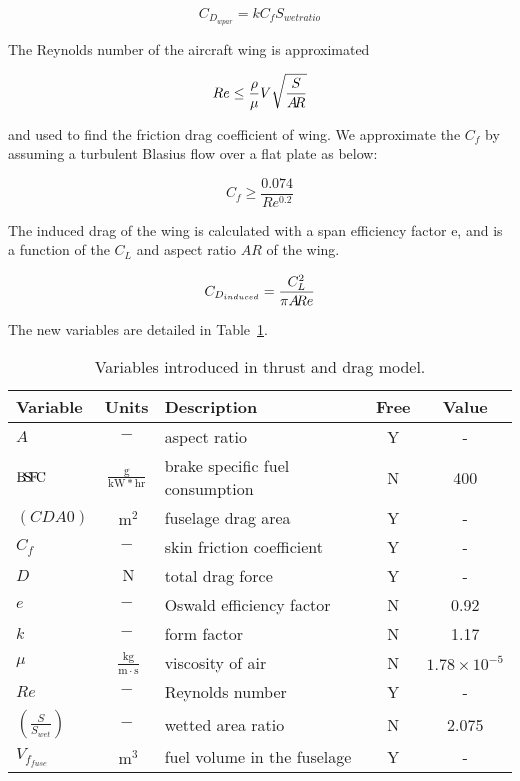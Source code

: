 \begin{equation}
    C_{D_{wpar}} = k C_f S_{wetratio}
\label{e:cdwpar}
\end{equation}

The Reynolds number of the aircraft wing is approximated

\begin{equation}
    Re \leq \frac{\rho}{\mu} V \sqrt{\frac{S}{A\hspace{-2.0pt}R}}
\label{e:re}
\end{equation}

and used to find the friction drag coefficient of wing. We approximate the $C_f$ by assuming a
turbulent Blasius flow over a flat plate as below:

\begin{equation}
    C_f \geq \frac{0.074} {Re^{0.2}}
\end{equation}

The induced drag of the wing is calculated with a span efficiency factor e, and is a
function of the $C_L$ and aspect ratio $AR$ of the wing.

\begin{equation}
    C_{D_{induced}} = \frac{C_L^2}{\pi A\hspace{-2.0pt}R e}
\label{e:cdinduced}
\end{equation}

The new variables are detailed in Table~\ref{t:vars_TandD}.

\begin{footnotesize}
\begin{table}
    \centering
    \begin{tabular}{ l c l c c }
        \toprule
        Variable & Units & Description & Free & Value \\
        \midrule
        $A$ & $-$ & aspect ratio & Y & - \\
        ${\rm B\!S\!F\!C}$ & $\mathrm{\frac{g}{kW*hr}}$ & brake specific fuel consumption & N & 400 \\
        $(CDA0)$ & $~\mathrm{m^{2}}$ & fuselage drag area & Y & - \\
        $C_f$ & $-$ & skin friction coefficient & Y & - \\
        $D$ & $~\mathrm{N}$ & total drag force & Y & - \\
        $e$ & $-$ & Oswald efficiency factor & N & 0.92 \\
        $k$ & $-$ & form factor & N & 1.17 \\
        $\mu$ & $~\mathrm{\tfrac{kg}{m\cdot s}}$ & viscosity of air & N &
            $\mathrm{1.78 \times 10^{-5}}$ \\
        $Re$ & $-$ & Reynolds number & Y & - \\
        $\left(\frac{S}{S_{wet}}\right)$ & $-$ & wetted area ratio & N & 2.075 \\
        $V_{f_{fuse}}$ & $~\mathrm{m^{3}}$ & fuel volume in the fuselage & Y & - \\
        \bottomrule
    \end{tabular}
    \caption{Variables introduced in thrust and drag model.}
    \label{t:vars_TandD}
\end{table} \end{footnotesize}

